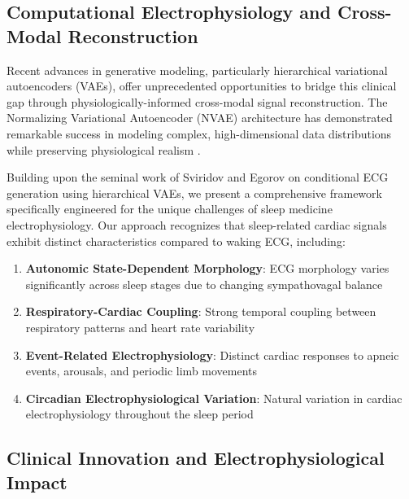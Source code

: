 \documentclass[11pt,en]{elegantpaper}
\begin{document}
\subsection{Computational Electrophysiology and Cross-Modal Reconstruction}

Recent advances in generative modeling, particularly hierarchical variational autoencoders (VAEs), offer unprecedented opportunities to bridge this clinical gap through physiologically-informed cross-modal signal reconstruction. The Normalizing Variational Autoencoder (NVAE) architecture has demonstrated remarkable success in modeling complex, high-dimensional data distributions while preserving physiological realism \cite{vahdat2020}.

Building upon the seminal work of Sviridov and Egorov \cite{sviridov2024} on conditional ECG generation using hierarchical VAEs, we present a comprehensive framework specifically engineered for the unique challenges of sleep medicine electrophysiology. Our approach recognizes that sleep-related cardiac signals exhibit distinct characteristics compared to waking ECG, including:

\begin{enumerate}
\item \textbf{Autonomic State-Dependent Morphology}: ECG morphology varies significantly across sleep stages due to changing sympathovagal balance
\item \textbf{Respiratory-Cardiac Coupling}: Strong temporal coupling between respiratory patterns and heart rate variability
\item \textbf{Event-Related Electrophysiology}: Distinct cardiac responses to apneic events, arousals, and periodic limb movements
\item \textbf{Circadian Electrophysiological Variation}: Natural variation in cardiac electrophysiology throughout the sleep period
\end{enumerate}

\subsection{Clinical Innovation and Electrophysiological Impact}
\end{document}
